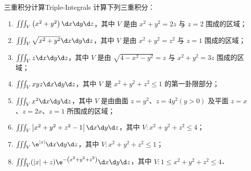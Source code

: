 \begin{problem}{三重积分计算}{Triple-Integrals}
    计算下列三重积分：
    \begin{enumerate}
        \item $\iiint_{V}\left(x^{2}+y^{2}\right) \d x \d y \d z$，其中 $V$ 是由 $x^{2}+y^{2}=2 z$ 与 $z=2$ 围成的区域；
        \item $\iiint_{V} \sqrt{x^{2}+y^{2}} \d x \d y \d z$，其中 $V$ 是由 $x^{2}+y^{2}=z^{2}$ 与 $z=1$ 围成的区域；
        \item $\iiint_{V} z \d x \d y \d z$，其中 $V$ 是由 $\sqrt{4-x^{2}-y^{2}}=z$ 与 $x^{2}+y^{2}=3 z$ 围成的区域；
        \item $\iiint_{V} x y z \d x \d y \d z$，其中 $V$ 是 $x^{2}+y^{2}+z^{2} \leqslant 1$ 的第一卦限部分；
        \item $\iiint_{V} x^{2} \d x \d y \d z$，其中 $V$ 是由曲面 $z=y^{2}$、$z=4 y^{2}(y>0)$ 及平面 $z=x$、$z=2 x$、$z=1$ 所围成的区域；
        \item $\iiint_{V}\left|x^{2}+y^{2}+z^{2}-1\right| \d x \d y \d z$，其中 $V: x^{2}+y^{2}+z^{2} \leqslant 4$；
        \item $\iiint_{V} \e^{|z|} \d x \d y \d z$，其中 $V: x^{2}+y^{2}+z^{2} \leqslant 1$；
        \item $\iiint_{V}(|x|+z) \e^{-\left(x^{2}+y^{2}+z^{2}\right)} \d x \d y \d z$，其中 $V: 1 \leqslant x^{2}+y^{2}+z^{2} \leqslant 4$．
    \end{enumerate}
\end{problem}


